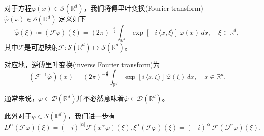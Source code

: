 \begin{definition}[傅里叶变换]
  对于方程$\varphi(x) \in \mathcal{S}(\mathbb{R}^d)$，我们将傅里叶变换(Fourier transform) $\widehat{\varphi}(x) \in \mathcal{S}(\mathbb{R}^d)$ 定义如下
  \begin{equation}
    \label{eq:sobo-distri-fourier-transform-def}
    \widehat{\varphi}(\xi) \coloneqq \left( \mathcal{F} \varphi \right)(\xi) =
    \left( 2 \pi \right)^{-\frac{d}{2}} \int_{\mathbb{R}^d}
    \exp \left[ - i \, \langle x, \xi \rangle \right] \,
    \varphi(x) \, dx, \quad \xi \in \mathbb{R}^d,
  \end{equation}
  其中$\mathcal{F}$是可逆映射$\mathcal{F}:\mathcal{S}(\mathbb{R}^d) \mapsto \mathcal{S}(\mathbb{R}^d)$。

  对应地，逆傅里叶变换(inverse Fourier transform)为
  \begin{equation}
    \label{eq:sobo-distri-inverse-fourier-transform-def}
    \left( \mathcal{F}^{-1} \widehat{\varphi} \right)(x) =
    \left( 2 \pi \right)^{-\frac{d}{2}} \int_{\mathbb{R}^d}
    \exp \left[ i \, \langle x, \xi \rangle \right] \,
    \widehat{\varphi}(\xi) \, dx, \quad x \in \mathbb{R}^d.
  \end{equation}

通常来说，$\varphi \in \mathcal{D}(\mathbb{R}^d)$并不必然意味着$\widehat{\varphi} \in \mathcal{D}(\mathbb{R}^d)$。

此外对于$\varphi \in \mathcal{S}(\mathbb{R}^d)$，我们进一步有
\begin{subequations}
  \begin{equation}
  \label{eq:sobolev-distribution-fourier-higher-order-f}
  D^{\alpha} \left( \mathcal{F} \varphi \right)(\xi) = (-i)^{\left| \alpha \right|} \mathcal{F}\left( x^{\alpha} \varphi \right) (\xi),
\end{equation}
\begin{equation}
  \label{eq:sobolev-distribution-fourier-higher-order-xi}
  \xi^{\alpha} \left( \mathcal{F} \varphi \right)(\xi) = (-i)^{\left| \alpha \right|} \mathcal{F} \left( D^{\alpha} \varphi \right) (\xi).
\end{equation}
\end{subequations}
\end{definition}


